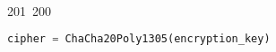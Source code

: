201~200~\documentclass{article}
\begin{document}
\begin{lstlisting}[language=Python, caption=Encrypting a Message with ChaCha20-Poly1305]
	                                                                                                                                                                                                                                                                                                	                                                                                                                                        	    	                                                                                                	                                                                                                                                                                                                                                                                                                                                	                                                                        	                                                                        	                                                                                                                                        	                                                                                                                                                                                                                        	                                                                                                                            	                                                                	                                                                                                                                    cipher = ChaCha20Poly1305(encryption_key)

\end{lstlisting}
\end{document}

